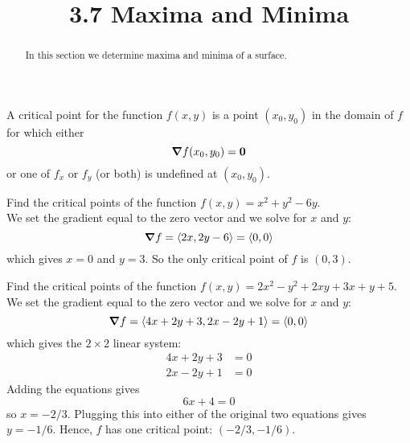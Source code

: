 \documentclass[handout]{ximera}
\title{3.7 Maxima and Minima}
\begin{document}
\begin{abstract}
In this section we determine maxima and minima of a surface.
\end{abstract}

\maketitle

\begin{definition}
A critical point for the function $f(x,y)$ is a point $(x_0, y_0)$ in the domain of $f$ for which either
\[
\boldsymbol\nabla f(x_0, y_0) = \mathbf 0
\]
or one of $f_x$ or $f_y$ (or both) is undefined at $(x_0, y_0)$.
\end{definition}

\begin{example}[Example 1]
Find the critical points of the function $f(x,y) = x^2 + y^2 - 6y$.\\
We set the gradient equal to the zero vector and we solve for $x$ and $y$:
\[
\boldsymbol\nabla f = \left\langle 2x, 2y -6\right\rangle = \left\langle 0,0\right\rangle
\]
which gives $x = 0$ and $y = 3$.  So the only critical point of $f$ is $(0,3)$.
\end{example}


\begin{example}[Example 2]
Find the critical points of the function $f(x,y) = 2x^2 - y^2 +2xy + 3x + y+ 5$.\\
We set the gradient equal to the zero vector and we solve for $x$ and $y$:
\[
\boldsymbol\nabla f = \left\langle 4x+2y + 3, 2x - 2y + 1\right\rangle = \left\langle 0,0\right\rangle
\]
which gives the $2 \times 2$ linear system:
\begin{align*}
4x+2y + 3 &= 0\\
2x -2y + 1 & = 0
\end{align*}
Adding the equations gives 
\[
6x + 4 = 0
\]
so $x = -2/3$. Plugging this into either of the original two equations gives $y = -1/6$.
Hence, $f$ has one critical point: $(-2/3, -1/6)$.
\end{example}
\end{document}
